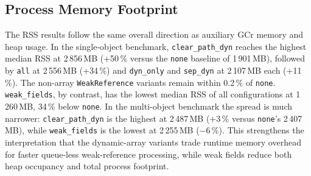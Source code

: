 \subsection{Process Memory Footprint}
\label{subsec:analysis-memory-rss}

The \ac{RSS} results follow the same overall direction as auxiliary \ac{GCr} memory and heap usage. In the single-object benchmark, \texttt{clear\_path\_dyn} reaches the highest median \ac{RSS} at 2\,856\,MB (+50\,\% versus the \texttt{none} baseline of 1\,901\,MB), followed by \texttt{all} at 2\,556\,MB (+34\,\%) and \texttt{dyn\_only} and \texttt{sep\_dyn} at 2\,107\,MB each (+11\,\%). The non-array \texttt{WeakReference} variants remain within 0.2\,\% of \texttt{none}. \texttt{weak\_fields}, by contrast, has the lowest median RSS of all configurations at 1\,260\,MB, 34\,\% below \texttt{none}. In the multi-object benchmark the spread is much narrower: \texttt{clear\_path\_dyn} is the highest at 2\,487\,MB (+3\,\% versus \texttt{none}'s 2\,407\,MB), while \texttt{weak\_fields} is the lowest at 2\,255\,MB (−6\,\%). This strengthens the interpretation that the dynamic-array variants trade runtime memory overhead for faster queue-less weak-reference processing, while weak fields reduce both heap occupancy and total process footprint.
